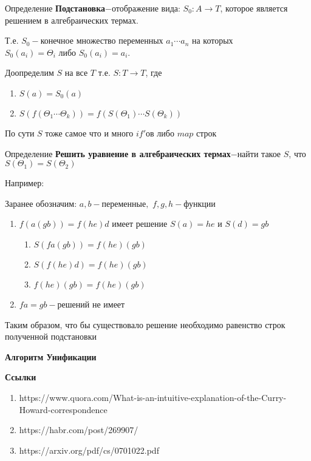 \documentclass[12pt, a4paper]{article}
\begin{document}
	\par Определение \textbf{Подстановка}$-$отображение вида: $S_0:A\to T$, которое является решением в алгебраических термах.\par Т.е. $S_0-$конечное множество переменных $a_1\dotsb a_n$ на которых $S_0(a_i)=\Theta_i\text{ либо }S_0(a_i)=a_i$.\par
	Доопределим $S$ на все $T$ т.е. $S:T\to T$, где \begin{enumerate}
		\item $S(a)=S_0(a)$
		\item $S(f(\Theta_1 \dotsb \Theta_k))=f(S(\Theta_1) \dotsb S(\Theta_k))$
	\end{enumerate}
	По сути $S$ тоже самое что и много $if'$ов либо $map$ строк\par 
	Определение \textbf{Решить уравнение в алгебраических термах}$-$найти такое $S$, что $S(\Theta_1)=S(\Theta_2)$\par 
	Например:\par 
		Заранее обозначим: $a,b-\text{переменные},$ $f,g,h-\text{функции}$
		\begin{enumerate}
			\item $f(a(gb))=f(he)d$ имеет решение $S(a)=he\text{ и }S(d)=gb$
				\begin{enumerate}
					\item $S(fa(gb))=f(he)(gb)$
					\item $S(f(he)d)=f(he)(gb)$
					\item $f(he)(gb)=f(he)(gb)$
				\end{enumerate}
			\item $fa=gb-$решений не имеет
		\end{enumerate}
		Таким образом, что бы существовало решение необходимо равенство строк полученной подстановки\par
		\textbf{Алгоритм Унификации}\par
		
\par \textbf{Ссылки}
\begin{enumerate}
\item https://www.quora.com/What-is-an-intuitive-explanation-of-the-Curry-Howard-correspondence
\item https://habr.com/post/269907/
\item https://arxiv.org/pdf/cs/0701022.pdf
\end{enumerate}
\end{document}
